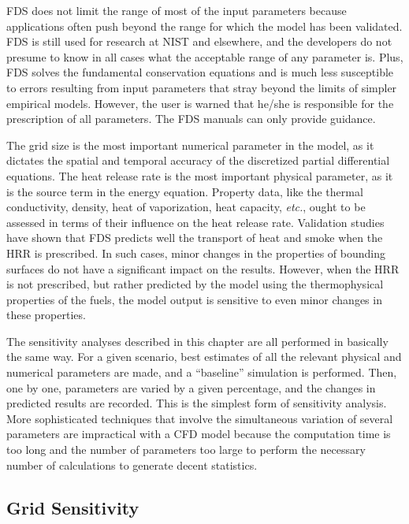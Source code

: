 \documentclass[11pt]{book}
\begin{document}
FDS does not  limit the range of most of  the input parameters because applications often push beyond the  range for which the model has been
validated.  FDS is still used  for research at NIST and elsewhere, and the developers do not presume to know in all cases what the acceptable range
of   any  parameter  is.  Plus,  FDS   solves  the  fundamental conservation  equations  and  is   much  less  susceptible  to  errors resulting
from  input parameters  that  stray  beyond  the limits  of simpler empirical models.  However, the user is warned  that he/she is responsible for
the prescription of all parameters.   The FDS manuals can only provide guidance.

The grid size is the  most important numerical parameter in the model, as it  dictates the spatial  and temporal accuracy of  the discretized partial
differential equations.  The heat  release rate  is  the most important physical parameter,  as it is the source  term in the energy equation.
Property data, like  the thermal conductivity, density, heat of vaporization,  heat capacity, {\em  etc.}, ought to be  assessed in terms of their
influence on  the heat release rate. Validation studies have shown that FDS predicts well the transport of heat and smoke when the HRR is prescribed.
In  such cases, minor changes in the properties of  bounding  surfaces  do  not  have  a  significant  impact  on  the results. However, when the HRR
is not prescribed, but rather predicted by the  model using  the thermophysical properties  of the  fuels, the model output is sensitive to even
minor changes in these properties.

The sensitivity  analyses described in this chapter  are all performed in basically the same way. For a given scenario, best estimates of all the
relevant  physical  and  numerical  parameters are  made,  and  a ``baseline'' simulation is performed. Then, one by one, parameters are varied by a
given percentage, and the changes in predicted results are recorded.  This is  the simplest  form of  sensitivity  analysis. More sophisticated
techniques that involve  the simultaneous  variation of several  parameters  are impractical  with  a  CFD  model because  the computation time is
too long and the number of parameters too large to perform  the  necessary  number  of calculations  to  generate  decent statistics.



\subsection{Grid Sensitivity}
\end{document}
